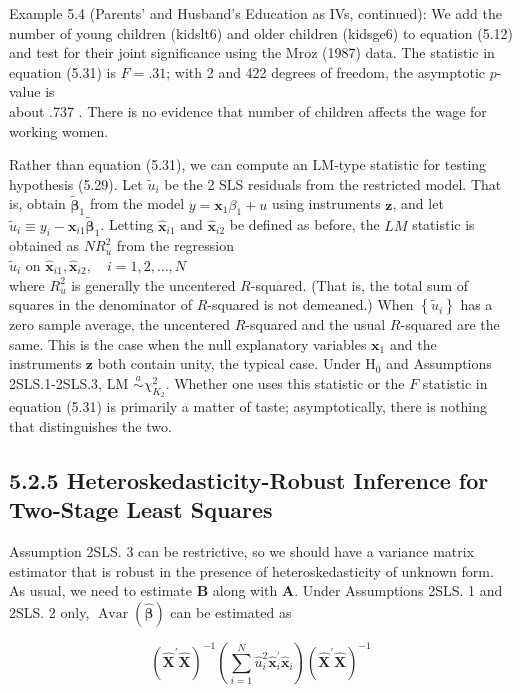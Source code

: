 \documentclass[10pt]{article}
\begin{document}
Example 5.4 (Parents' and Husband's Education as IVs, continued): We add the number of young children (kidslt6) and older children (kidsge6) to equation (5.12) and test for their joint significance using the Mroz (1987) data. The statistic in equation (5.31) is $F=.31$; with 2 and 422 degrees of freedom, the asymptotic $p$-value is\\
about .737 . There is no evidence that number of children affects the wage for working women.

Rather than equation (5.31), we can compute an LM-type statistic for testing hypothesis (5.29). Let $\tilde{u}_{i}$ be the 2 SLS residuals from the restricted model. That is, obtain $\tilde{\boldsymbol{\beta}}_{1}$ from the model $y=\mathbf{x}_{1} \beta_{1}+u$ using instruments $\mathbf{z}$, and let $\tilde{u}_{i} \equiv y_{i}-\mathbf{x}_{i 1} \tilde{\boldsymbol{\beta}}_{1}$. Letting $\hat{\mathbf{x}}_{i 1}$ and $\hat{\mathbf{x}}_{i 2}$ be defined as before, the $L M$ statistic is obtained as $N R_{u}^{2}$ from the regression\\
$\tilde{u}_{i}$ on $\hat{\mathbf{x}}_{i 1}, \hat{\mathbf{x}}_{i 2}, \quad i=1,2, \ldots, N$\\
where $R_{u}^{2}$ is generally the uncentered $R$-squared. (That is, the total sum of squares in the denominator of $R$-squared is not demeaned.) When $\left\{\tilde{u}_{i}\right\}$ has a zero sample average, the uncentered $R$-squared and the usual $R$-squared are the same. This is the case when the null explanatory variables $\mathbf{x}_{1}$ and the instruments $\mathbf{z}$ both contain unity, the typical case. Under $\mathrm{H}_{0}$ and Assumptions 2SLS.1-2SLS.3, LM $\stackrel{a}{\sim} \chi_{K_{2}}^{2}$. Whether one uses this statistic or the $F$ statistic in equation (5.31) is primarily a matter of taste; asymptotically, there is nothing that distinguishes the two.

\subsection*{5.2.5 Heteroskedasticity-Robust Inference for Two-Stage Least Squares}
Assumption 2SLS. 3 can be restrictive, so we should have a variance matrix estimator that is robust in the presence of heteroskedasticity of unknown form. As usual, we need to estimate $\mathbf{B}$ along with $\mathbf{A}$. Under Assumptions 2SLS. 1 and 2SLS. 2 only, $\operatorname{Avar}(\hat{\boldsymbol{\beta}})$ can be estimated as


\begin{equation*}
\left(\hat{\mathbf{X}}^{\prime} \hat{\mathbf{X}}\right)^{-1}\left(\sum_{i=1}^{N} \hat{u}_{i}^{2} \hat{\mathbf{x}}_{i}^{\prime} \hat{\mathbf{x}}_{i}\right)\left(\hat{\mathbf{X}}^{\prime} \hat{\mathbf{X}}\right)^{-1} \tag{5.34}
\end{equation*}
\end{document}
